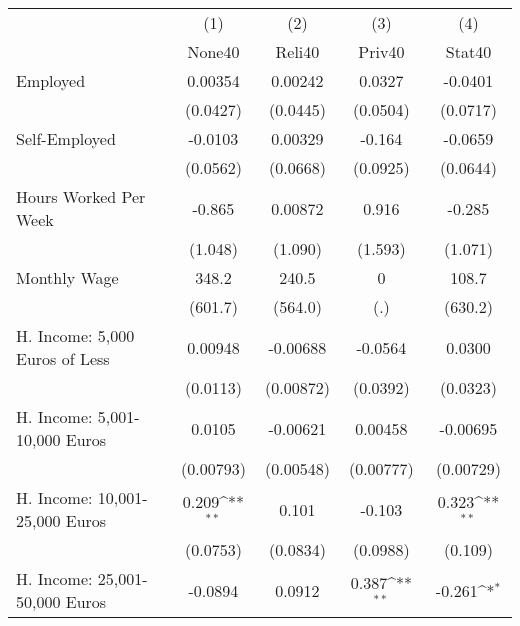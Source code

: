 {
\def\sym#1{\ifmmode^{#1}\else\(^{#1}\)\fi}
\begin{tabular}{l*{4}{c}}
\hline\hline
            &\multicolumn{1}{c}{(1)}&\multicolumn{1}{c}{(2)}&\multicolumn{1}{c}{(3)}&\multicolumn{1}{c}{(4)}\\
            &\multicolumn{1}{c}{None40}&\multicolumn{1}{c}{Reli40}&\multicolumn{1}{c}{Priv40}&\multicolumn{1}{c}{Stat40}\\
\hline
Employed    &     0.00354         &     0.00242         &      0.0327         &     -0.0401         \\
            &    (0.0427)         &    (0.0445)         &    (0.0504)         &    (0.0717)         \\
[1em]
Self-Employed&     -0.0103         &     0.00329         &      -0.164         &     -0.0659         \\
            &    (0.0562)         &    (0.0668)         &    (0.0925)         &    (0.0644)         \\
[1em]
Hours Worked Per Week&      -0.865         &     0.00872         &       0.916         &      -0.285         \\
            &     (1.048)         &     (1.090)         &     (1.593)         &     (1.071)         \\
[1em]
Monthly Wage&       348.2         &       240.5         &           0         &       108.7         \\
            &     (601.7)         &     (564.0)         &         (.)         &     (630.2)         \\
[1em]
H. Income: 5,000 Euros of Less&     0.00948         &    -0.00688         &     -0.0564         &      0.0300         \\
            &    (0.0113)         &   (0.00872)         &    (0.0392)         &    (0.0323)         \\
[1em]
H. Income: 5,001-10,000 Euros&      0.0105         &    -0.00621         &     0.00458         &    -0.00695         \\
            &   (0.00793)         &   (0.00548)         &   (0.00777)         &   (0.00729)         \\
[1em]
H. Income: 10,001-25,000 Euros&       0.209\sym{**} &       0.101         &      -0.103         &       0.323\sym{**} \\
            &    (0.0753)         &    (0.0834)         &    (0.0988)         &     (0.109)         \\
[1em]
H. Income: 25,001-50,000 Euros&     -0.0894         &      0.0912         &       0.387\sym{**} &      -0.261\sym{*}  \\

\end{tabular}}
